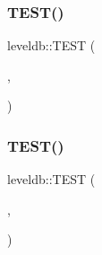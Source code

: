 \subsubsection{\texorpdfstring{TEST()}{TEST()}\hspace{0.1cm}{\footnotesize\ttfamily [4/102]}}
{\footnotesize\ttfamily leveldb\+::\+T\+E\+ST (\begin{DoxyParamCaption}\item[{\mbox{\hyperlink{classleveldb_1_1_format_test}{Format\+Test}}}]{,  }\item[{Internal\+Key\+\_\+\+Encode\+Decode}]{ }\end{DoxyParamCaption})}

\mbox{\label{namespaceleveldb_a21e74b2de9a6f3db48c8d3ff277a1e0d}} 
\subsubsection{\texorpdfstring{TEST()}{TEST()}\hspace{0.1cm}{\footnotesize\ttfamily [5/102]}}
{\footnotesize\ttfamily leveldb\+::\+T\+E\+ST (\begin{DoxyParamCaption}\item[{\mbox{\hyperlink{classleveldb_1_1_skip_test}{Skip\+Test}}}]{,  }\item[{Insert\+And\+Lookup}]{ }\end{DoxyParamCaption})}

